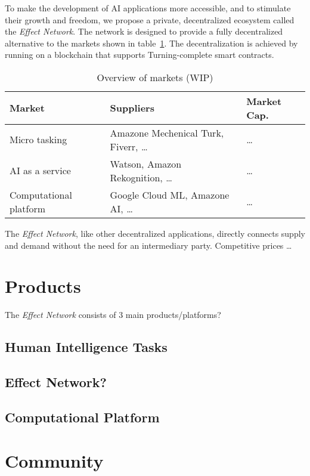 \documentclass{article}
\begin{document}
To make the development of AI applications more accessible, and to
stimulate their growth and freedom, we propose a private,
decentralized ecosystem called the \emph{Effect Network}. The network
is designed to provide a fully decentralized alternative to the
markets shown in table~\ref{tab:service_compare}. The decentralization
is achieved by running on a blockchain that supports Turning-complete
smart contracts.

\begin{table}
  \centering
  \begin{tabular}[h]{l|l|l}
    \textbf{Market} & \textbf{Suppliers} & \textbf{Market Cap.} \\ \hline
    Micro tasking & Amazone Mechenical Turk, Fiverr, \dots & \dots \\ 
    AI as a service & Watson, Amazon Rekognition, \dots & \dots \\
    Computational platform & Google Cloud ML, Amazone AI, \dots & \dots 
  \end{tabular}
  \caption{Overview of markets (WIP)}\label{tab:service_compare}
\end{table}

The \emph{Effect Network}, like other decentralized applications,
directly connects supply and demand without the need for an
intermediary party. Competitive prices \dots

\section{Products}

The \emph{Effect Network} consists of 3 main products/platforms?

\subsection{Human Intelligence Tasks}

\subsection{Effect Network?}

\subsection{Computational Platform}

\section{Community}
\end{document}
